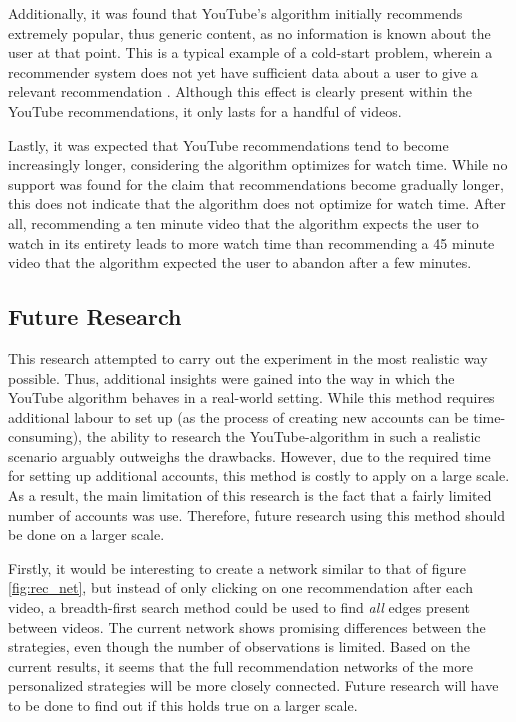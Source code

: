 \documentclass[../main.tex]{subfiles}
\begin{document}
Additionally, it was found that YouTube's algorithm initially recommends extremely popular, thus generic content, as no
information is known about the user at that point. This is a typical example of a cold-start problem, wherein a
recommender system does not yet have sufficient data about a user to give a relevant recommendation
\citep{lam2008addressing}. Although this effect is clearly present within the YouTube recommendations, it only lasts for
a handful of videos. 

Lastly, it was expected that YouTube recommendations tend to become increasingly longer, considering the algorithm
optimizes for watch time. While no support was found for the claim that recommendations become gradually longer, this
does not indicate that the algorithm does not optimize for watch time. After all, recommending a ten minute video that
the algorithm expects the user to watch in its entirety leads to more watch time than recommending a 45 minute video
that the algorithm expected the user to abandon after a few minutes. 

\subsection{Future Research}
This research attempted to carry out the experiment in the most realistic way possible. Thus, additional insights were 
gained into the way in which the YouTube algorithm behaves in a real-world setting. While this method requires 
additional labour to set up (as the process of creating new accounts can be time-consuming), the ability to research the
YouTube-algorithm in such a realistic scenario arguably outweighs the drawbacks. However, due to the required time for
setting up additional accounts, this method is costly to apply on a large scale. As a result, the main limitation of
this research is the fact that a fairly limited number of accounts was use. Therefore, future research using this method
should be done on a larger scale. 

Firstly, it would be interesting to create a network similar to that of figure \ref{fig:rec_net}, but instead of only 
clicking on one recommendation after each video, a breadth-first search method could be used to find \textit{all} edges 
present between videos. The current network shows promising differences between the strategies, even though the number 
of observations is limited. Based on the current results, it seems that the full recommendation networks of the more
personalized strategies will be more closely connected. Future research will have to be done to find out if this holds
true on a larger scale. 
\end{document}
